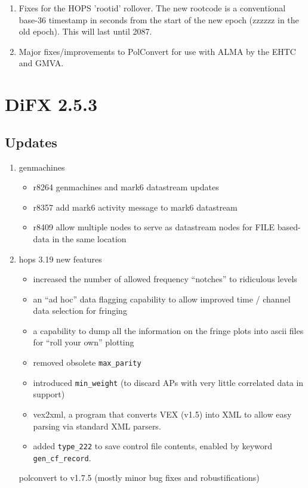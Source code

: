 \begin{enumerate}

\item Fixes for the HOPS 'rootid' rollover.  The new rootcode is a conventional base-36 timestamp in seconds from the start of the new epoch (zzzzzz in the old epoch).  This will last until 2087.
\item Major fixes/improvements to PolConvert for use with ALMA by the EHTC and GMVA.

\end{enumerate}


\section{DiFX 2.5.3}

\subsection{Updates}

\begin{enumerate}

\item genmachines
\begin{itemize}
  \item r8264 genmachines and mark6 datastream updates
  \item r8357 add mark6 activity message to mark6 datastream
  \item r8409 allow multiple nodes to serve as datastream nodes for FILE based-data in the same location
\end{itemize}
\item hops 3.19 new features
\begin{itemize}
  \item increased the number of allowed frequency ``notches'' to ridiculous levels
  \item an “ad hoc” data flagging capability to allow improved time / channel data selection for fringing
  \item a capability to dump all the information on the fringe plots into ascii files for “roll your own” plotting
  \item removed obsolete {\tt max\_parity}
  \item introduced {\tt min\_weight} (to discard APs with very little correlated data in support)
  \item vex2xml, a program that converts VEX (v1.5) into XML to allow easy parsing via standard XML parsers.
  \item added {\tt type\_222} to save control file contents, enabled by keyword {\tt gen\_cf\_record}.
\end{itemize}
    polconvert to v1.7.5 (mostly minor bug fixes and robustifications)
\end{enumerate}

